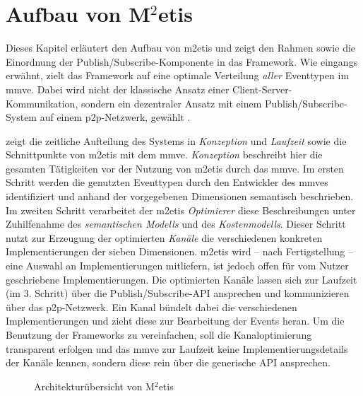 \section{Aufbau von M$^2$etis}
\label{chap:aufbau_metis}
Dieses Kapitel erläutert den Aufbau von \ac{m2etis} und zeigt den Rahmen sowie die Einordnung der Publish/Subscribe-Komponente in das Framework. Wie eingangs erwähnt, zielt das Framework auf eine optimale Verteilung \emph{aller} Eventtypen im \ac{mmve}. Dabei wird nicht der klassische Ansatz einer Client-Server-Kommunikation, sondern ein dezentraler Ansatz mit einem Publish/Subscribe-System auf einem \ac{p2p}-Netzwerk, gewählt \cite{Fischer2010a}.

 zeigt die zeitliche Aufteilung des Systems in \emph{Konzeption} und \emph{Laufzeit} sowie die Schnittpunkte von \ac{m2etis} mit dem \ac{mmve}. \emph{Konzeption} beschreibt hier die gesamten Tätigkeiten vor der Nutzung von \ac{m2etis} durch das \ac{mmve}. Im ersten Schritt werden die genutzten Eventtypen durch den Entwickler des \acp{mmve} identifiziert und anhand der vorgegebenen Dimensionen semantisch beschrieben. Im zweiten Schritt verarbeitet der \ac{m2etis} \emph{Optimierer} diese Beschreibungen unter Zuhilfenahme des \emph{semantischen Modells} und des \emph{Kostenmodells}. Dieser Schritt nutzt zur Erzeugung der optimierten \emph{Kanäle} die verschiedenen konkreten Implementierungen der sieben Dimensionen. \ac{m2etis} wird -- nach Fertigstellung -- eine Auswahl an Implementierungen mitliefern, ist jedoch offen für vom Nutzer geschriebene Implementierungen.
Die optimierten Kanäle lassen sich zur Laufzeit (im 3. Schritt) über die Publish/Subscribe-API ansprechen und kommunizieren über das \ac{p2p}-Netzwerk. Ein Kanal bündelt dabei die verschiedenen Implementierungen und zieht diese zur Bearbeitung der Events heran. Um die Benutzung der Frameworks zu vereinfachen, soll die Kanaloptimierung transparent erfolgen und das \ac{mmve} zur Laufzeit keine Implementierungsdetails der Kanäle kennen, sondern diese rein über die generische API ansprechen.


\begin{figure}[htbp]
\centering
{}
\caption{Architekturübersicht von M$^2$etis}
\label{fig:metis_aufbau}
\end{figure}


